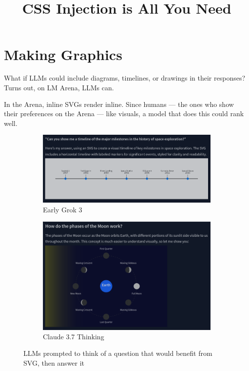 \documentclass[11pt,a4paper]{article}
\title{CSS Injection is All You Need}
\author{\vspace{-5ex}}
\date{\vspace{-5ex}}
\begin{document}
\maketitle

\section{Making Graphics}
What if LLMs could include diagrams, timelines, or drawings in their responses? Turns out, on LM Arena, LLMs can.

In the Arena, inline SVGs render inline. Since humans --- the ones who show their preferences on the Arena --- like visuals, a model that does this could rank well.

\begin{figure}[htbp]
    \centering
    \begin{subfigure}[b]{0.45\textwidth}
        \centering
        \includegraphics[width=\textwidth]{Screenshot From 2025-03-14 21-33-22.png}
        \caption{Early Grok 3}
        \label{fig:image1}
    \end{subfigure}
    \hfill
    \begin{subfigure}[b]{0.45\textwidth}
        \centering
        \includegraphics[width=\textwidth]{Screenshot From 2025-03-14 21-33-11.png}
        \caption{Claude 3.7 Thinking}
        \label{fig:image2}
    \end{subfigure}
    \caption{LLMs prompted to think of a question that would benefit from SVG, then answer it}
    \label{fig:images}
\end{figure}
\end{document}
